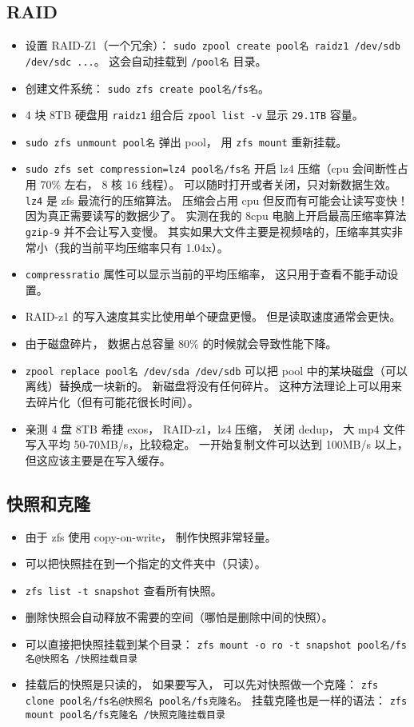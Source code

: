 \subsection{RAID}
\begin{itemize}
\item 设置 RAID-Z1（一个冗余）： \verb|sudo zpool create pool名 raidz1 /dev/sdb /dev/sdc ...|。 这会自动挂载到 \verb|/pool名| 目录。
\item 创建文件系统： \verb|sudo zfs create pool名/fs名|。
\item 4 块 8TB 硬盘用 \verb|raidz1| 组合后 \verb|zpool list -v| 显示 \verb|29.1TB| 容量。
\item \verb|sudo zfs unmount pool名| 弹出 pool， 用 \verb|zfs mount| 重新挂载。
\item \verb|sudo zfs set compression=lz4 pool名/fs名| 开启 lz4 压缩（cpu 会间断性占用 70\% 左右， 8 核 16 线程）。 可以随时打开或者关闭，只对新数据生效。 \verb|lz4| 是 zfs 最流行的压缩算法。 压缩会占用 cpu 但反而有可能会让读写变快！ 因为真正需要读写的数据少了。 实测在我的 8cpu 电脑上开启最高压缩率算法 \verb|gzip-9| 并不会让写入变慢。 其实如果大文件主要是视频啥的，压缩率其实非常小（我的当前平均压缩率只有 1.04x）。
\item \verb|compressratio| 属性可以显示当前的平均压缩率， 这只用于查看不能手动设置。
\item RAID-z1 的写入速度其实比使用单个硬盘更慢。 但是读取速度通常会更快。
\item 由于磁盘碎片， 数据占总容量 80\% 的时候就会导致性能下降。
\item \verb|zpool replace pool名 /dev/sda /dev/sdb| 可以把 pool 中的某块磁盘（可以离线）替换成一块新的。 新磁盘将没有任何碎片。 这种方法理论上可以用来去碎片化（但有可能花很长时间）。
\item 亲测 4 盘 8TB 希捷 exos， RAID-z1，lz4 压缩， 关闭 dedup， 大 mp4 文件写入平均 50-70MB/s，比较稳定。 一开始复制文件可以达到 100MB/s 以上，但这应该主要是在写入缓存。
\end{itemize}

\subsection{快照和克隆}
\begin{itemize}
\item 由于 zfs 使用 copy-on-write， 制作快照非常轻量。
\item 可以把快照挂在到一个指定的文件夹中（只读）。
\item \verb|zfs list -t snapshot| 查看所有快照。
\item 删除快照会自动释放不需要的空间（哪怕是删除中间的快照）。
\item 可以直接把快照挂载到某个目录： \verb|zfs mount -o ro -t snapshot pool名/fs名@快照名 /快照挂载目录|
\item 挂载后的快照是只读的， 如果要写入， 可以先对快照做一个克隆： \verb|zfs clone pool名/fs名@快照名 pool名/fs克隆名|。 挂载克隆也是一样的语法： \verb|zfs mount pool名/fs克隆名 /快照克隆挂载目录|
\end{itemize}

